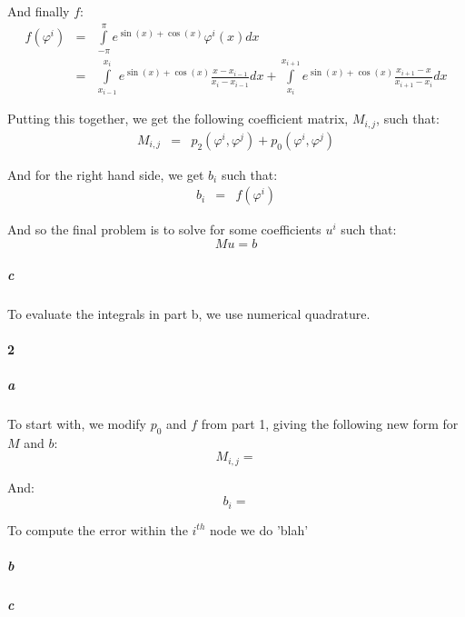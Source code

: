 \documentclass{article}
\begin{document}
And finally $f$:
\begin{eqnarray*}
f(\varphi^i) & = & \int \limits_{-\pi}^{\pi} e^{\sin(x) + \cos(x)} \varphi^i(x) dx \\
& = & \int \limits_{x_{i-1}}^{x_i} e^{\sin(x) + \cos(x)} \frac{x - x_{i-1}}{x_{i} - x_{i-1}} dx + \int \limits_{x_{i}}^{x_{i+1}} e^{\sin(x) + \cos(x)} \frac{x_{i+1} - x}{x_{i+1} - x_{i}} dx
\end{eqnarray*}

Putting this together, we get the following coefficient matrix, $M_{i,j}$, such that:
\begin{eqnarray*}
M_{i,j} & = & p_2(\varphi^i, \varphi^j) + p_0(\varphi^i, \varphi^j)
\end{eqnarray*}

And for the right hand side, we get $b_i$ such that:
\begin{eqnarray*}
b_i & = & f(\varphi^i)
\end{eqnarray*}

And so the final problem is to solve for some coefficients $u^i$ such that:
\[ M u = b \]

\subparagraph{c}

To evaluate the integrals in part b, we use numerical quadrature.

\paragraph{2}

\subparagraph{a}

To start with, we modify $p_0$ and $f$ from part 1, giving the following new form for $M$ and $b$:
\[ M_{i,j} = \]

And:
\[ b_i = \]

To compute the error within the $i^{th}$ node we do 'blah'

\subparagraph{b}

\subparagraph{c}
\end{document}
